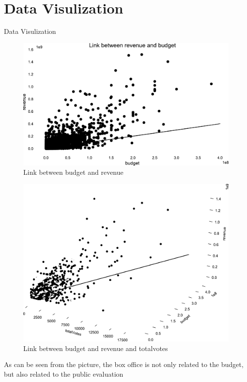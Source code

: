 \documentclass[
 size=12pt,
 paper=smartboard, %
 mode=present, %
 display=slides, %
style=tuliplab,
pauseslide,
fleqn,leqno]{powerdot}
\begin{document}
\section{Data Visulization}
\begin{slide}{ Data Visulization}
   
  \begin{figure}[ht]%
	\centering%
	\includegraphics[scale=0.05]{logos/1.eps}
	\caption{Link between budget and revenue}%
	\end{figure}

   \begin{figure}[ht]%
   	\centering%
   	\includegraphics[scale=0.05]{logos/2.eps}
   	\caption{Link between budget and revenue and totalvotes}%
   \end{figure}

 As can be seen from the picture, the box office is not only related to the budget, but also related to the public evaluation

\end{slide}
\end{document}
